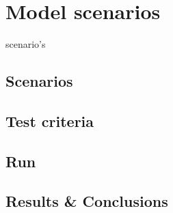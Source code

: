 \chapter{Model scenarios}
\label{chapter:model_scenarios}
scenario's

\section{Scenarios}

\section{Test criteria}

\section{Run}

\section{Results \& Conclusions}
